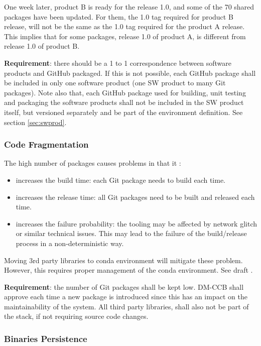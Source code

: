 One week later, product B is ready for the release 1.0, and some of the 70 shared packages have been updated.
For them, the 1.0 tag required for product B release, will not be the same as the 1.0 tag required for the product A release.
This implies that for some packages, release 1.0 of product A, is different from release 1.0 of product B.

\textbf{Requirement}: there should be a 1 to 1 correspondence between software products and GitHub packaged. 
If this is not possible, each GitHub package shall be included in only one software product (one SW product to many Git packages).
Note also that, each GitHub package used for building, unit testing and packaging the software products shall not be included in the SW product itself, but versioned separately and be part of the environment definition. See section \ref{sec:swprod}.


\subsubsection{Code Fragmentation} \label{sec:problemCode}

The high number of packages causes problems in that it :

\begin{itemize}
\item increases the build time: each Git package needs to build each time.
\item increases the release time: all Git packages need to be built and released each time.
\item increases the failure probability: the tooling may be affected by network glitch or similar technical issues. 
This may lead to the failure of the build/release process in a non-deterministic way.
\end{itemize}

Moving 3rd party libraries to conda environment will mitigate these problem. 
However, this requires proper management of the conda environment. See draft .

\textbf{Requirement}: the number of Git packages shall be kept low. DM-CCB shall approve each time a new package is introduced since this has an impact on the maintainability of the system. 
All third party libraries, shall also not be part of the stack, if not requiring source code changes.


\subsubsection{Binaries Persistence} \label{sec:problemPersistence}


